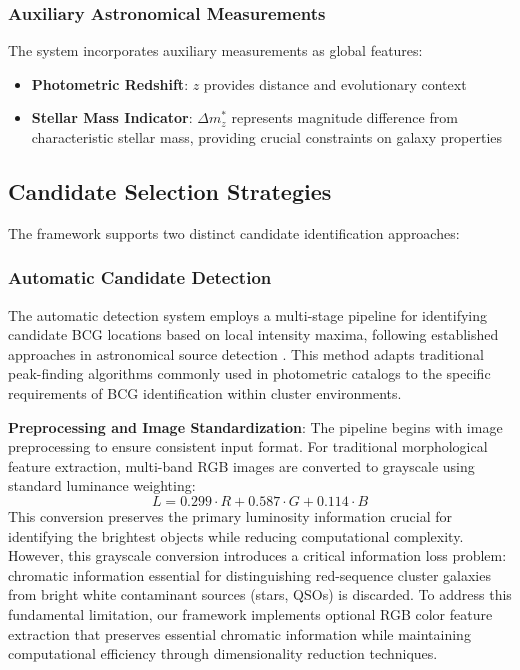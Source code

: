 \documentclass[twocolumn,10pt]{aastex631}
\begin{document}
\subsubsection{Auxiliary Astronomical Measurements}
The system incorporates auxiliary measurements as global features:
\begin{itemize}
\item \textbf{Photometric Redshift}: $z$ provides distance and evolutionary context
\item \textbf{Stellar Mass Indicator}: $\Delta m^*_z$ represents magnitude difference from characteristic stellar mass, providing crucial constraints on galaxy properties
\end{itemize}

\subsection{Candidate Selection Strategies}

The framework supports two distinct candidate identification approaches:

\subsubsection{Automatic Candidate Detection}

The automatic detection system employs a multi-stage pipeline for identifying candidate BCG locations based on local intensity maxima, following established approaches in astronomical source detection \citep{Bertin1996}. This method adapts traditional peak-finding algorithms commonly used in photometric catalogs to the specific requirements of BCG identification within cluster environments.

\textbf{Preprocessing and Image Standardization}: The pipeline begins with image preprocessing to ensure consistent input format. For traditional morphological feature extraction, multi-band RGB images are converted to grayscale using standard luminance weighting:
\begin{equation}
L = 0.299 \cdot R + 0.587 \cdot G + 0.114 \cdot B
\end{equation}
This conversion preserves the primary luminosity information crucial for identifying the brightest objects while reducing computational complexity. However, this grayscale conversion introduces a critical information loss problem: chromatic information essential for distinguishing red-sequence cluster galaxies from bright white contaminant sources (stars, QSOs) is discarded. To address this fundamental limitation, our framework implements optional RGB color feature extraction that preserves essential chromatic information while maintaining computational efficiency through dimensionality reduction techniques.
\end{document}
